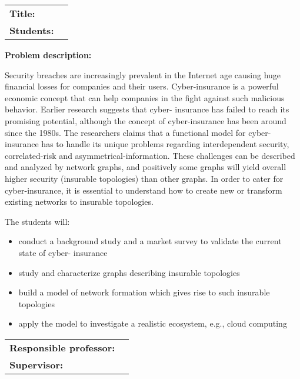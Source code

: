 \begin{titlingpage}

\noindent
\begin{tabular}{@{}p{4cm}l}
\textbf{Title:} 	& \thetitle \\
\textbf{Students:}	& \theauthor \\
\end{tabular}

\vspace{4ex}
\noindent\textbf{Problem description:}

Security breaches are increasingly prevalent in the Internet age causing huge financial losses
for companies and their users. Cyber-insurance is a powerful economic concept that can help
companies in the fight against such malicious behavior. Earlier research suggests that cyber-
insurance has failed to reach its promising potential, although the concept of cyber-insurance has
been around since the 1980s. The researchers claims that a functional model for cyber-insurance has to handle its unique problems regarding interdependent security, correlated-risk and asymmetrical-information. These challenges can be described and analyzed by network graphs, and positively some graphs will yield overall higher security (insurable topologies) than other graphs. In order to cater for cyber-insurance, it is essential to understand how to create new or transform existing networks to insurable topologies.

The students will:
\begin{itemize}

\item conduct a background study and a market survey to validate the current state of cyber-
insurance
\item study and characterize graphs describing insurable topologies
\item build a model of network formation which gives rise to such insurable topologies
\item apply the model to investigate a realistic ecosystem, e.g., cloud computing

\end{itemize}
\vspace{2ex}

\noindent
\begin{tabular}{@{}p{4cm}l}
\textbf{Responsible professor:} 	& \theprofessor \\
\textbf{Supervisor:}			& \thesupervisor \\
\end{tabular}

\end{titlingpage}